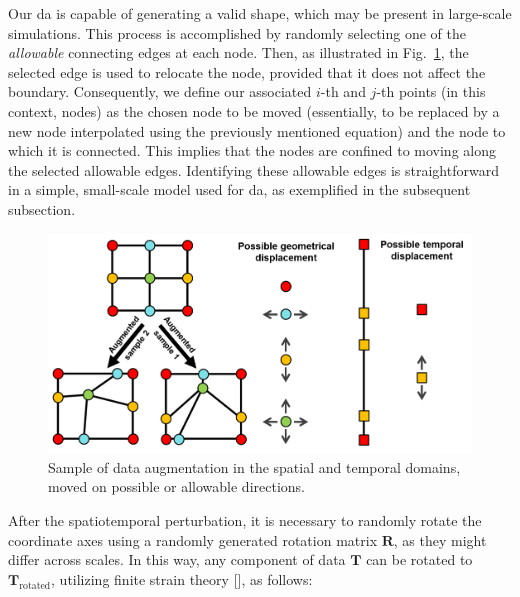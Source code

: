 \documentclass[12pt,a4paper]{report}
\begin{document}
Our \ac{da} is capable of generating a valid shape, which may be present in large-scale simulations. This process is accomplished by randomly selecting one of the \textit{allowable} connecting edges at each node. Then, as illustrated in Fig.~\ref{fig:augmentation}, the selected edge is used to relocate the node, provided that it does not affect the boundary. Consequently, we define our associated $i$-th and $j$-th points (in this context, nodes) as the chosen node to be moved (essentially, to be replaced by a new node interpolated using the previously mentioned equation) and the node to which it is connected. This implies that the nodes are confined to moving along the selected allowable edges. Identifying these allowable edges is straightforward in a simple, small-scale model used for \ac{da}, as exemplified in the subsequent subsection.
%
\begin{figure}\centering
\includegraphics[width=0.8\linewidth,keepaspectratio]{augmentation.png}
\caption{Sample of data augmentation in the spatial and temporal domains, moved on possible or allowable directions.}\label{fig:augmentation}
\end{figure}

After the spatiotemporal perturbation, it is necessary to randomly rotate the coordinate axes using a randomly generated rotation matrix $\mathbf{R}$, as they might differ across scales. In this way, any component of data $\mathbf{T}$ can be rotated to $\mathbf{T}_\text{rotated}$, utilizing finite strain theory [\cite{gerhard-book}], as follows:
\end{document}

